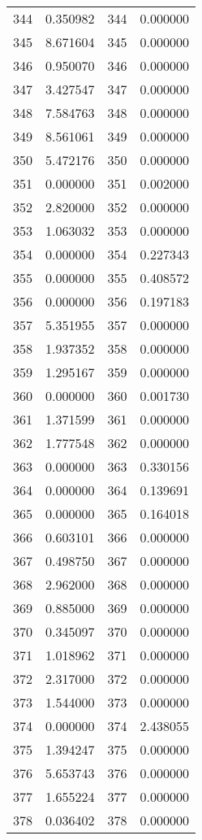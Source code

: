 \documentclass[12pt]{article}
\begin{document}
\begin{longtable}{@{}cccc@{}}
344 & 0.350982 & 344 & 0.000000 \\
345 & 8.671604 & 345 & 0.000000 \\
346 & 0.950070 & 346 & 0.000000 \\
347 & 3.427547 & 347 & 0.000000 \\
348 & 7.584763 & 348 & 0.000000 \\
349 & 8.561061 & 349 & 0.000000 \\
350 & 5.472176 & 350 & 0.000000 \\
351 & 0.000000 & 351 & 0.002000 \\
352 & 2.820000 & 352 & 0.000000 \\
353 & 1.063032 & 353 & 0.000000 \\
354 & 0.000000 & 354 & 0.227343 \\
355 & 0.000000 & 355 & 0.408572 \\
356 & 0.000000 & 356 & 0.197183 \\
357 & 5.351955 & 357 & 0.000000 \\
358 & 1.937352 & 358 & 0.000000 \\
359 & 1.295167 & 359 & 0.000000 \\
360 & 0.000000 & 360 & 0.001730 \\
361 & 1.371599 & 361 & 0.000000 \\
362 & 1.777548 & 362 & 0.000000 \\
363 & 0.000000 & 363 & 0.330156 \\
364 & 0.000000 & 364 & 0.139691 \\
365 & 0.000000 & 365 & 0.164018 \\
366 & 0.603101 & 366 & 0.000000 \\
367 & 0.498750 & 367 & 0.000000 \\
368 & 2.962000 & 368 & 0.000000 \\
369 & 0.885000 & 369 & 0.000000 \\
370 & 0.345097 & 370 & 0.000000 \\
371 & 1.018962 & 371 & 0.000000 \\
372 & 2.317000 & 372 & 0.000000 \\
373 & 1.544000 & 373 & 0.000000 \\
374 & 0.000000 & 374 & 2.438055 \\
375 & 1.394247 & 375 & 0.000000 \\
376 & 5.653743 & 376 & 0.000000 \\
377 & 1.655224 & 377 & 0.000000 \\
378 & 0.036402 & 378 & 0.000000 \\

\end{longtable}
\end{document}
